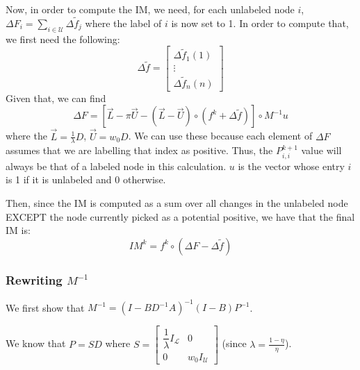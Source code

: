 \documentclass[12pt]{article}
\renewcommand{\L}{\mathcal{L}}
\newcommand{\U}{\mathcal{U}}
\newcommand{\inv}[1]{#1^{-1}}
\begin{document}
			Now, in order to compute the IM, we need, for each unlabeled node $i$,\\ $\Delta F_i = \sum\limits_{i\in \U} \Delta \widetilde{f}_j$ where the label of $i$ is now set to 1. In order to compute that, we first need the following:
			$$\Delta \widetilde{f} = \left[\begin{matrix}\Delta \widetilde{f}_1(1)\\ \vdots \\ \Delta\widetilde{f}_{n}(n)\end{matrix}\right]$$
			Given that, we can find 
			\begin{equation}
				\Delta F = \left[\overrightarrow{L} - \pi\overrightarrow{U} - (\overrightarrow{L}-\overrightarrow{U})\circ(f^k + \Delta \widetilde{f})\right] \circ \inv{M} u
			\end{equation}
			where the $\overrightarrow{L} = \frac{1}{\lambda}D$, $\overrightarrow{U} = w_0 D$. We can use these because each element of $\Delta F$ assumes that we are labelling that index as positive. Thus, the $P_{i,i}^{k+1}$ value will always be that of a labeled node in this  calculation. $u$ is the vector whose entry $i$ is 1 if it is unlabeled and 0 otherwise.

			Then, since the IM is computed as a sum over all changes in the unlabeled node EXCEPT the node currently picked as a potential positive, we have that the final IM is:
			\begin{equation}
				IM^k = f^k \circ (\Delta F - \Delta \widetilde{f})
			\end{equation}

		\subsubsection{Rewriting $\inv{M}$}
			We first show that $\inv{M} = \inv{(I - B\inv{D}A)}(I-B)\inv{P}$.

			We know that $P=SD$ where 
			$S = \left[\begin{matrix}\dfrac{1}{\lambda} I_\L&0 \\ 0&w_0 I_\U\end{matrix}\right]$ (since $\lambda = \frac{1-\eta}{\eta}$).
\end{document}
